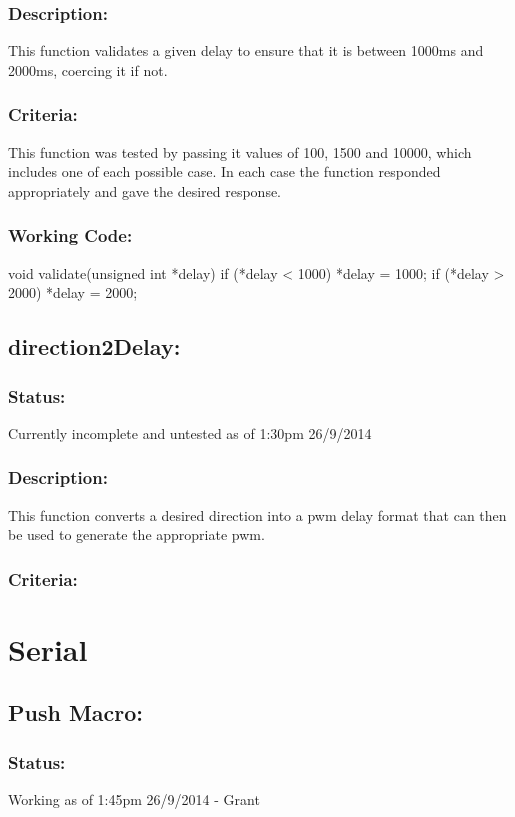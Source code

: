 \documentclass[]{article}
\begin{document}
\subsubsection{Description:}
This function validates a given delay to ensure that it is between 1000ms and 2000ms, coercing it if not.

\subsubsection{Criteria:}
This function was tested by passing it values of 100, 1500 and 10000, which includes one of each possible case. In each case the function responded appropriately and gave the desired response.

\subsubsection{Working Code:}
void validate(unsigned int *delay)
{
	if (*delay < 1000)
	{
		*delay = 1000;
	}
	if (*delay > 2000)
	{
		*delay = 2000;
	}
}

\subsection{direction2Delay:}
\subsubsection{Status:}
Currently incomplete and untested as of 1:30pm 26/9/2014

\subsubsection{Description:}
This function converts a desired direction into a pwm delay format that can then be used to generate the appropriate pwm.

\subsubsection{Criteria:}

\newpage
\section{Serial}
\subsection{Push Macro:}
\subsubsection{Status:}
Working as of 1:45pm 26/9/2014 - Grant
\end{document}
